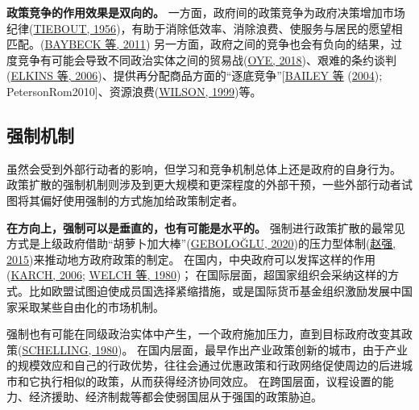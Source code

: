 \documentclass[
  12pt,
]{ctexart}
\begin{document}
\textbf{政策竞争的作用效果是双向的。}
一方面，政府间的政策竞争为政府决策增加市场纪律(\protect\hyperlink{ref-Tiebout1956}{TIEBOUT, 1956})，有助于消除低效率、消除浪费、使服务与居民的愿望相匹配。(\protect\hyperlink{ref-BaybeckEtAl2011}{BAYBECK 等, 2011})
另一方面，政府之间的竞争也会有负向的结果，过度竞争有可能会导致不同政治实体之间的贸易战(\protect\hyperlink{ref-Oye2018}{OYE, 2018})、艰难的条约谈判(\protect\hyperlink{ref-ElkinsEtAl2006}{ELKINS 等, 2006})、提供再分配商品方面的``逐底竞争''{[}\protect\hyperlink{ref-BaileyRom2004}{BAILEY 等} (\protect\hyperlink{ref-BaileyRom2004}{2004}); PetersonRom2010{]}、资源浪费(\protect\hyperlink{ref-Wilson1999}{WILSON, 1999})等。

\hypertarget{ux5f3aux5236ux673aux5236}{%
\subsection{强制机制}\label{ux5f3aux5236ux673aux5236}}

虽然会受到外部行动者的影响，但学习和竞争机制总体上还是政府的自身行为。
政策扩散的强制机制则涉及到更大规模和更深程度的外部干预，一些外部行动者试图将其偏好使用强制的方式施加给政策制定者。

\textbf{在方向上，强制可以是垂直的，也有可能是水平的。}
强制进行政策扩散的最常见方式是上级政府借助``胡萝卜加大棒''(\protect\hyperlink{ref-Gebologlu2020}{GEBOLOĞLU, 2020})的压力型体制(\protect\hyperlink{ref-ZhaoQiang2015}{赵强, 2015})来推动地方政府政策的制定。
在国内，中央政府可以发挥这样的作用(\protect\hyperlink{ref-Karch2006}{KARCH, 2006}; \protect\hyperlink{ref-WelchThompson1980}{WELCH 等, 1980})；
在国际层面，超国家组织会采纳这样的方式。比如欧盟试图迫使成员国选择紧缩措施，或是国际货币基金组织激励发展中国家采取某些自由化的市场机制。

强制也有可能在同级政治实体中产生，一个政府施加压力，直到目标政府改变其政策(\protect\hyperlink{ref-Schelling1980}{SCHELLING, 1980})。
在国内层面，最早作出产业政策创新的城市，由于产业的规模效应和自己的行政优势，往往会通过优惠政策和行政网络促使周边的后进城市和它执行相似的政策，从而获得经济协同效应。
在跨国层面，议程设置的能力、经济援助、经济制裁等都会使弱国屈从于强国的政策胁迫。
\end{document}
